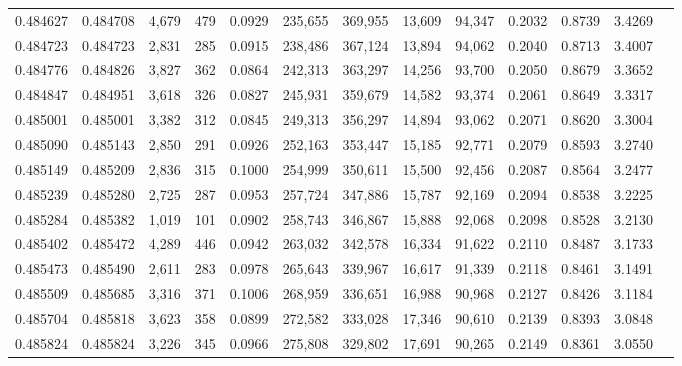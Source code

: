 \begin{tabular}{rrrrrrrrrrrrr}
0.484627 & 0.484708 & 4,679 &   479 &                                     0.0929 & 235,655 & 369,955 &  13,609 &  94,347 & 0.2032 & 0.8739 & 3.4269 \\
0.484723 & 0.484723 & 2,831 &   285 &                                     0.0915 & 238,486 & 367,124 &  13,894 &  94,062 & 0.2040 & 0.8713 & 3.4007 \\
0.484776 & 0.484826 & 3,827 &   362 &                                     0.0864 & 242,313 & 363,297 &  14,256 &  93,700 & 0.2050 & 0.8679 & 3.3652 \\
0.484847 & 0.484951 & 3,618 &   326 &                                     0.0827 & 245,931 & 359,679 &  14,582 &  93,374 & 0.2061 & 0.8649 & 3.3317 \\
0.485001 & 0.485001 & 3,382 &   312 &                                     0.0845 & 249,313 & 356,297 &  14,894 &  93,062 & 0.2071 & 0.8620 & 3.3004 \\
0.485090 & 0.485143 & 2,850 &   291 &                                     0.0926 & 252,163 & 353,447 &  15,185 &  92,771 & 0.2079 & 0.8593 & 3.2740 \\
0.485149 & 0.485209 & 2,836 &   315 &                                     0.1000 & 254,999 & 350,611 &  15,500 &  92,456 & 0.2087 & 0.8564 & 3.2477 \\
0.485239 & 0.485280 & 2,725 &   287 &                                     0.0953 & 257,724 & 347,886 &  15,787 &  92,169 & 0.2094 & 0.8538 & 3.2225 \\
0.485284 & 0.485382 & 1,019 &   101 &                                     0.0902 & 258,743 & 346,867 &  15,888 &  92,068 & 0.2098 & 0.8528 & 3.2130 \\
0.485402 & 0.485472 & 4,289 &   446 &                                     0.0942 & 263,032 & 342,578 &  16,334 &  91,622 & 0.2110 & 0.8487 & 3.1733 \\
0.485473 & 0.485490 & 2,611 &   283 &                                     0.0978 & 265,643 & 339,967 &  16,617 &  91,339 & 0.2118 & 0.8461 & 3.1491 \\
0.485509 & 0.485685 & 3,316 &   371 &                                     0.1006 & 268,959 & 336,651 &  16,988 &  90,968 & 0.2127 & 0.8426 & 3.1184 \\
0.485704 & 0.485818 & 3,623 &   358 &                                     0.0899 & 272,582 & 333,028 &  17,346 &  90,610 & 0.2139 & 0.8393 & 3.0848 \\
0.485824 & 0.485824 & 3,226 &   345 &                                     0.0966 & 275,808 & 329,802 &  17,691 &  90,265 & 0.2149 & 0.8361 & 3.0550 \\

\end{tabular}
